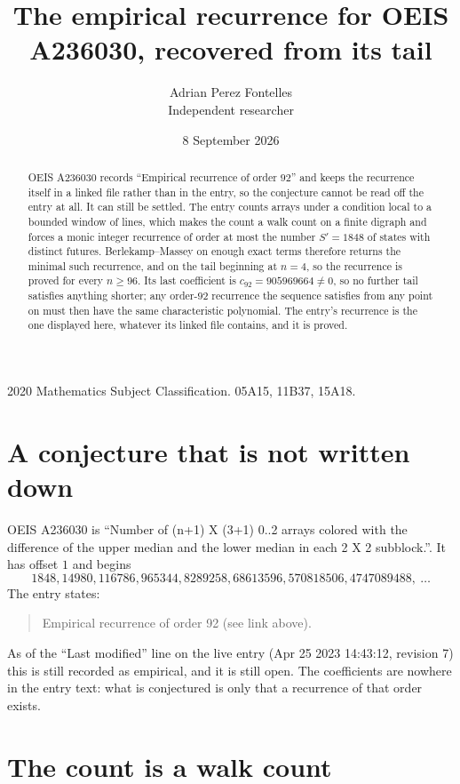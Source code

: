 \documentclass[11pt,a4paper]{article}
\title{The empirical recurrence for OEIS A236030, recovered from its tail}
\author{Adrian Perez Fontelles\\ \small Independent researcher}
\date{8 September 2026}
\theoremstyle{plain}
\theoremstyle{definition}
\begin{document}
\maketitle

\begin{abstract}
OEIS A236030 records ``Empirical recurrence of order $92$'' and keeps the recurrence itself in
a linked file rather than in the entry, so the conjecture cannot be read off the entry at all.
It can still be settled. The entry counts arrays under a condition local to a bounded window of
lines, which makes the count a walk count on a finite digraph and forces a monic integer
recurrence of order at most the number $S'=1848$ of states with distinct futures. Berlekamp--Massey on
enough exact terms therefore returns the minimal such recurrence, and on the tail beginning at $n=4$, so the recurrence is proved for every $n\ge96$.
Its last coefficient is $c_{92}=905969664\neq0$, so no further tail satisfies anything
shorter; any order-$92$ recurrence the sequence satisfies from any point on must then have
the same characteristic polynomial. The entry's recurrence is the one displayed here, whatever
its linked file contains, and it is proved.
\end{abstract}

\noindent\small 2020 Mathematics Subject Classification. 05A15, 11B37, 15A18.\normalsize

\section{A conjecture that is not written down}

OEIS A236030 is ``Number of (n+1) X (3+1) 0..2 arrays colored with the difference of the upper median and the lower median in each 2 X 2 subblock.''. It has offset $1$ and begins
\[
1848, 14980, 116786, 965344, 8289258, 68613596, 570818506, 4747089488,\ \dots
\]
The entry states:
\begin{quote}
Empirical recurrence of order 92 (see link above).
\end{quote}
As of the ``Last modified'' line on the live entry (Apr 25 2023 14:43:12, revision 7)
this is still recorded as empirical, and it is still open. The coefficients are nowhere in the
entry text: what is conjectured is only that a recurrence of that order exists.

\section{The count is a walk count}
\end{document}
